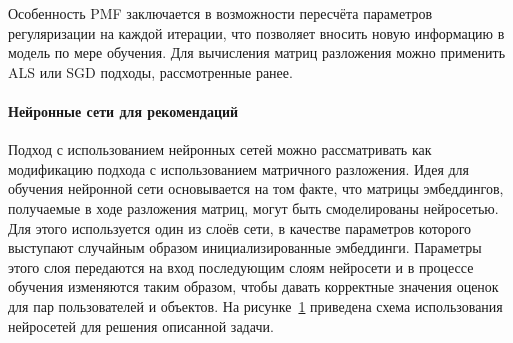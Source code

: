 Особенность PMF заключается в возможности пересчёта параметров регуляризации на каждой итерации, что позволяет вносить новую информацию в модель по мере обучения.
Для вычисления матриц разложения можно применить ALS или SGD подходы, рассмотренные ранее.


\paragraph{Нейронные сети для рекомендаций}

Подход с использованием нейронных сетей можно рассматривать как модификацию подхода с использованием матричного разложения.
Идея для обучения нейронной сети основывается на том факте, что матрицы эмбеддингов, получаемые в ходе разложения матриц, могут быть смоделированы нейросетью.
Для этого используется один из слоёв сети, в качестве параметров которого выступают случайным образом инициализированные эмбеддинги.
Параметры этого слоя передаются на вход последующим слоям нейросети и в процессе обучения изменяются таким образом, чтобы давать корректные значения оценок для пар пользователей и объектов.
На рисунке~\ref{fig:nn_idea} приведена схема использования нейросетей для решения описанной задачи.

\begin{figure}[h!]
\caption{}
\label{fig:nn_idea}
\end{figure}


